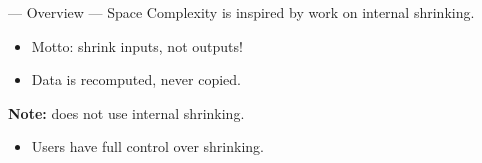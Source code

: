 \begin{frame}{\halcheck{} --- Overview --- Space Complexity}
   is inspired by work on \alert{internal shrinking}.
  \begin{itemize}
    \item Motto: shrink inputs, not outputs!
    \item Data is recomputed, never copied.
  \end{itemize}

  \pause{}

  \textbf{Note:}  does \alert{not} use internal shrinking.
  \begin{itemize}
    \item Users have full control over shrinking.
  \end{itemize}
\end{frame}

